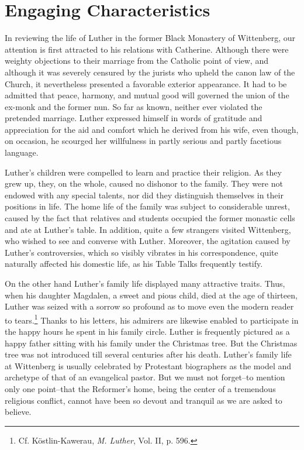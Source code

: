 \section{Engaging Characteristics}

In reviewing the life of Luther in the former Black Monastery of
Wittenberg, our attention is first attracted to his relations with Catherine.
Although there were weighty objections to their marriage from
the Catholic point of view, and although it was severely censured by
the jurists who upheld the canon law of the Church, it nevertheless
presented a favorable exterior appearance. It had to be admitted that
peace, harmony, and mutual good will governed the union of the
ex-monk and the former nun. So far as known, neither ever violated
the pretended marriage. Luther expressed himself in words of
gratitude and appreciation for the aid and comfort which he derived
from his wife, even though, on occasion, he scourged her willfulness
in partly serious and partly facetious language.

Luther’s children were compelled to learn and practice their religion.
As they grew up, they, on the whole, caused no dishonor to the
family. They were not endowed with any special talents, nor did
they distinguish themselves in their positions in life.
The home life of the family was subject to considerable unrest,
caused by the fact that relatives and students occupied the former
monastic cells and ate at Luther’s table. In addition, quite a few
strangers visited Wittenberg, who wished to see and converse with
Luther. Moreover, the agitation caused by Luther’s controversies,
which so visibly vibrates in his correspondence, quite naturally affected
his domestic life, as his Table Talks frequently testify.

On the other hand Luther’s family life displayed many attractive
traits. Thus, when his daughter Magdalen, a sweet and pious child,
died at the age of thirteen, Luther was seized with a sorrow so profound
as to move even the modern reader to tears.\footnote{Cf. Köstlin-Kawerau, \textit{M. Luther}, Vol. II, p. 596.}
Thanks to his
letters, his admirers are likewise enabled to participate in the happy
hours he spent in his family circle. Luther is frequently pictured as
a happy father sitting with his family under the Christmas tree. But
the Christmas tree was not introduced till several centuries after his
death. Luther’s family life at Wittenberg is usually celebrated by
Protestant biographers as the model and archetype of that of an
evangelical pastor. But we must not forget--to mention only one
point--that the Reformer’s home, being the center of a tremendous
religious conflict, cannot have been so devout and tranquil as we are
asked to believe.

